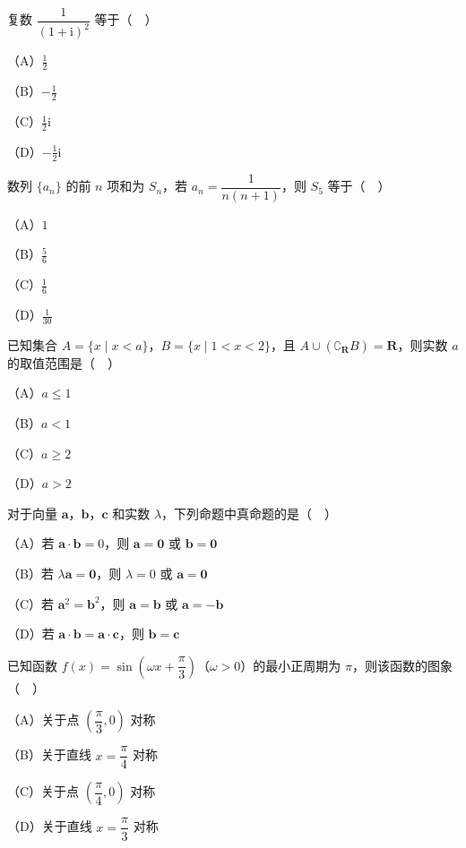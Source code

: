 


\begin{question}
复数 $\dfrac1{(1+\mathrm i)^2}$ 等于（　）

（A）$\frac12$

（B）$-\frac12$

（C）$\frac12\mathrm i$

（D）$-\frac12\mathrm i$

\end{question}
\begin{question}
数列 $\{a_n\}$ 的前 $n$ 项和为 $S_n$，若 $a_n=\dfrac1{n(n+1)}$，则 $S_5$ 等于（　）

（A）$1$

（B）$\frac56$

（C）$\frac16$

（D）$\frac1{30}$

\end{question}
\begin{question}
已知集合 $A=\{x\mid x<a\}$，$B=\{x\mid 1<x<2\}$，且 $A\cup(\complement_{\mathbf R}B)=\mathbf R$，则实数 $a$ 的取值范围是（　）

（A）$a\leqslant1$

（B）$a<1$

（C）$a\geqslant2$

（D）$a>2$

\end{question}
\begin{question}
对于向量 $\boldsymbol a$，$\boldsymbol b$，$\boldsymbol c$ 和实数 $\lambda$，下列命题中真命题的是（　）

（A）若 $\boldsymbol a\cdot\boldsymbol b=0$，则 $\boldsymbol a=\boldsymbol 0$ 或 $\boldsymbol b=\boldsymbol 0$

（B）若 $\lambda\boldsymbol a=\boldsymbol 0$，则 $\lambda=0$ 或 $\boldsymbol a=\boldsymbol 0$

（C）若 $\boldsymbol a^2=\boldsymbol b^2$，则 $\boldsymbol a=\boldsymbol b$ 或 $\boldsymbol a=-\boldsymbol b$

（D）若 $\boldsymbol a\cdot\boldsymbol b=\boldsymbol a\cdot\boldsymbol c$，则 $\boldsymbol b=\boldsymbol c$

\end{question}
\begin{question}
已知函数 $f(x)=\sin\left(\omega x+\dfrac{\pi}3\right)$（$\omega>0$）的最小正周期为 $\pi$，则该函数的图象（　）

（A）关于点 $\left(\dfrac{\pi}3,0\right)$ 对称

（B）关于直线 $x=\dfrac{\pi}4$ 对称

（C）关于点 $\left(\dfrac{\pi}4,0\right)$ 对称

（D）关于直线 $x=\dfrac{\pi}3$ 对称

\end{question}
